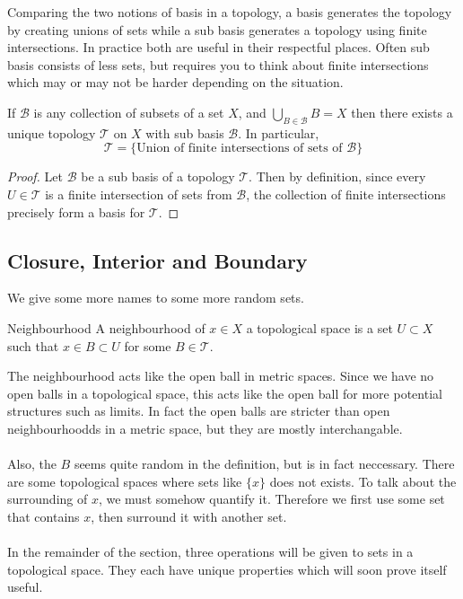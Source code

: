 \documentclass[a4paper]{article}
\begin{document}
Comparing the two notions of basis in a topology, a basis generates the topology by creating unions of sets while a sub basis generates a topology using finite intersections. In practice both are useful in their respectful places. Often sub basis consists of less sets, but requires you to think about finite intersections which may or may not be harder depending on the situation. 

\begin{prp}{}{} If $\mathcal{B}$ is any collection of subsets of a set $X$, and $\bigcup_{B\in\mathcal{B}}B=X$ then there exists a unique topology $\mathcal{T}$ on $X$ with sub basis $\mathcal{B}$. In particular, $$\mathcal{T}=\{\text{Union of finite intersections of sets of }\mathcal{B}\}$$ \tcbline
\begin{proof}
Let $\mathcal{B}$ be a sub basis of a topology $\mathcal{T}$. Then by definition, since every $U\in\mathcal{T}$ is a finite intersection of sets from $\mathcal{B}$, the collection of finite intersections precisely form a basis for $\mathcal{T}$. 
\end{proof}
\end{prp}

\subsection{Closure, Interior and Boundary}
We give some more names to some more random sets. 
\begin{defn}{Neighbourhood}{} A neighbourhood of $x\in X$ a topological space is a set $U\subset X$ such that $x\in B\subset U$ for some $B\in\mathcal{T}$. 
\end{defn}

The neighbourhood acts like the open ball in metric spaces. Since we have no open balls in a topological space, this acts like the open ball for more potential structures such as limits. In fact the open balls are stricter than open neighbourhoodds in a metric space, but they are mostly interchangable. \\~\\
Also, the $B$ seems quite random in the definition, but is in fact neccessary. There are some topological spaces where sets like $\{x\}$ does not exists. To talk about the surrounding of $x$, we must somehow quantify it. Therefore we first use some set that contains $x$, then surround it with another set. \\~\\

In the remainder of the section, three operations will be given to sets in a topological space. They each have unique properties which will soon prove itself useful. 
\end{document}
